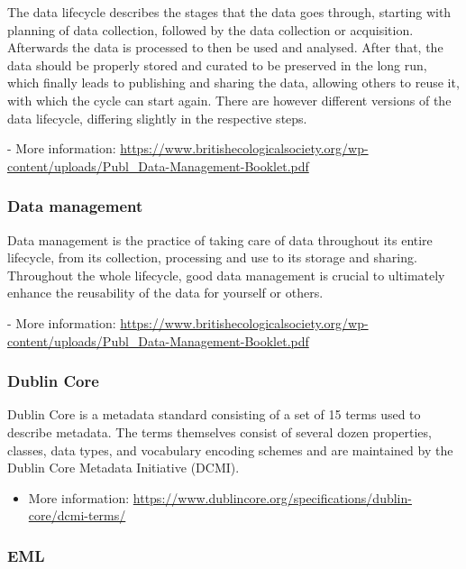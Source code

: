 \documentclass[
  oneside]{book}
\providecommand{\tightlist}{%
  \setlength{\itemsep}{0pt}\setlength{\parskip}{0pt}}
\begin{document}
The data lifecycle describes the stages that the data goes through, starting with planning of data collection, followed by the data collection or acquisition. Afterwards the data is processed to then be used and analysed. After that, the data should be properly stored and curated to be preserved in the long run, which finally leads to publishing and sharing the data, allowing others to reuse it, with which the cycle can start again. There are however different versions of the data lifecycle, differing slightly in the respective steps.

{- More information: \url{https://www.britishecologicalsociety.org/wp-content/uploads/Publ_Data-Management-Booklet.pdf}}

\subsubsection*{Data management}\label{datamanagement}

Data management is the practice of taking care of data throughout its entire lifecycle, from its collection, processing and use to its storage and sharing. Throughout the whole lifecycle, good data management is crucial to ultimately enhance the reusability of the data for yourself or others.

{- More information: \url{https://www.britishecologicalsociety.org/wp-content/uploads/Publ_Data-Management-Booklet.pdf}}

\subsubsection*{Dublin Core}\label{dublincore}

Dublin Core is a metadata standard consisting of a set of 15 terms used to describe metadata. The terms themselves consist of several dozen properties, classes, data types, and vocabulary encoding schemes and are maintained by the Dublin Core Metadata Initiative (DCMI).

\begin{itemize}
\tightlist
\item
  More information: \url{https://www.dublincore.org/specifications/dublin-core/dcmi-terms/}
\end{itemize}

\subsubsection*{EML}\label{eml}
\end{document}
